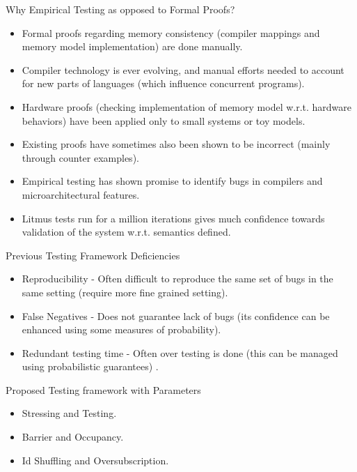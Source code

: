 \documentclass{beamer}
\begin{document}
    \begin{frame}{Why Empirical Testing as opposed to Formal Proofs?}

        \begin{itemize}
            \item Formal proofs regarding memory consistency (compiler mappings and memory model implementation) are done manually. 
            \item Compiler technology is ever evolving, and manual efforts needed to account for new parts of languages (which influence concurrent programs).
            \item Hardware proofs (checking implementation of memory model w.r.t. hardware behaviors) have been applied only to small systems or toy models.
            \item Existing proofs have sometimes also been shown to be incorrect (mainly through counter examples).
            \item Empirical testing has shown promise to identify bugs in compilers and microarchitectural features.
            \item Litmus tests run for a million iterations gives much confidence towards validation of the system w.r.t. semantics defined. 
        \end{itemize}

    \end{frame}

    \begin{frame}{Previous Testing Framework Deficiencies}

        \begin{itemize}
            \item Reproducibility - Often difficult to reproduce the same set of bugs in the same setting (require more fine grained setting).
            \item False Negatives - Does not guarantee lack of bugs (its confidence can be enhanced using some measures of probability).
            \item Redundant testing time - Often over testing is done (this can be managed using probabilistic guarantees) .
        \end{itemize}

    \end{frame}

    \begin{frame}{Proposed Testing framework with Parameters}

        \begin{itemize}
            \item Stressing and Testing.
            \item Barrier and Occupancy.
            \item Id Shuffling and Oversubscription.
        \end{itemize} 

    \end{frame}
\end{document}
